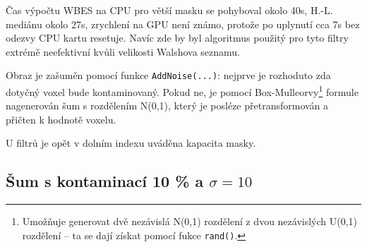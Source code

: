     Čas výpočtu WBES na CPU pro větší masku se pohyboval okolo 40s, H.-L. mediánu okolo 27s, zrychlení na GPU není známo, protože po uplynutí cca 7s bez odezvy CPU kartu resetuje. Navíc zde by byl algoritmus použitý pro tyto filtry extrémě neefektivní kvůli velikosti Walshova seznamu.
    
    Obraz je zašuměn pomocí funkce {\tt AddNoise(...)}: nejprve je rozhoduto zda dotyčný voxel bude kontaminovaný. Pokud ne, je pomocí Box-Mulleorvy\footnote{Umožňuje generovat dvě nezávislá N(0,1) rozdělení z dvou nezávislých U(0,1) rozdělení -- ta se dají získat pomocí fukce {\tt rand()}.} formule nagenerován šum s rozdělením N(0,1), který je posléze přetransformován a přičten k hodnotě voxelu.
    
    U filtrů je opět v dolním indexu uváděna kapacita masky.
    
    \subsection{Šum s kontaminací 10 \% a $\sigma = 10$}

